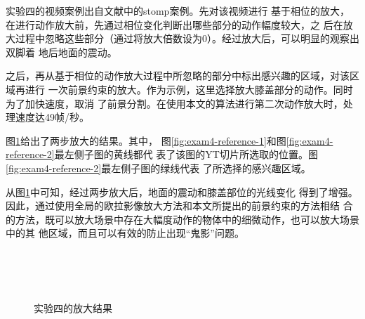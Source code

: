 实验四的视频案例出自文献\cite{Wadhwa2013PhaseBased}中的stomp案例。先对该视频进行
基于相位的放大，在进行动作放大前，先通过相位变化判断出哪些部分的动作幅度较大，之
后在放大过程中忽略这些部分（通过将放大倍数设为0）。经过放大后，可以明显的观察出双脚着
地后地面的震动。

之后，再从基于相位的动作放大过程中所忽略的部分中标出感兴趣的区域，对该区域再进行
一次前景约束的放大。作为示例，这里选择放大膝盖部分的动作。同时为了加快速度，取消
了前景分割。在使用本文的算法进行第二次动作放大时，处理速度达49帧/秒。

图\ref{fig:exam4-result}给出了两步放大的结果。其中，
图\ref{fig:exam4-reference-1}和图\ref{fig:exam4-reference-2}最左侧子图的黄线都代
表了该图的YT切片所选取的位置。图\ref{fig:exam4-reference-2}最左侧子图的绿线代表
了所选择的感兴趣区域。

从图\ref{fig:exam4-result}中可知，经过两步放大后，地面的震动和膝盖部位的光线变化
得到了增强。因此，通过使用全局的欧拉影像放大方法和本文所提出的前景约束的方法相结
合的方法，既可以放大场景中存在大幅度动作的物体中的细微动作，也可以放大场景中的其
他区域，而且可以有效的防止出现“鬼影”问题。

\clearpage

\begin{figure}[htbp]
  \centering
  \\
  \\
  \\
  \caption{实验四的放大结果}
  \label{fig:exam4-result}
\end{figure}

